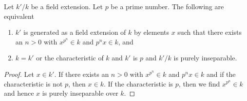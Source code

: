 \begin{lemma}
\label{lemma-p-ring-map-field}
Let $k'/k$ be a field extension. Let $p$ be a prime number.
The following are equivalent
\begin{enumerate}
\item $k'$ is generated as a field extension of $k$ by elements
$x$ such that there exists an $n > 0$ with $x^{p^n} \in k$ and
$p^nx \in k$, and
\item $k = k'$ or the characteristic of $k$
and $k'$ is $p$ and $k'/k$ is purely inseparable.
\end{enumerate}
\end{lemma}

\begin{proof}
Let $x \in k'$. If there exists an $n > 0$ with $x^{p^n} \in k$ and
$p^nx \in k$ and if the characteristic is not $p$, then $x \in k$.
If the characteristic is $p$, then we find $x^{p^n} \in k$
and hence $x$ is purely inseparable over $k$.
\end{proof}